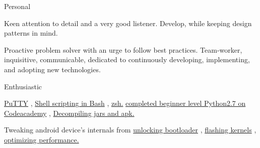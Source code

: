 \begin{skillsentries}
    
    \skillsentry
    {Personal} %
    {
      \begin{skillsitems} %
        \item {Keen attention to detail and a very good listener. Develop, while keeping design patterns in mind.}
        \item {Proactive problem solver with an urge to follow best practices. Team-worker, inquisitive, communicable, 
        dedicated to continuously developing, implementing, and adopting new technologies.}
      \end{skillsitems}
      }
      
      \skillsentry
      {Enthusiastic} %
      {
        \begin{skillsitems} %
          \item {{\href{https://www.putty.org}{PuTTY}}
          , 
          {\href{https://en.wikibooks.org/wiki/Bash_Shell_Scripting}{Shell scripting in Bash}}
          ,  
          {\href{http://zsh.sourceforge.net}{zsh.}} 
          {\href{https://www.codecademy.com/learn}{completed beginner level Python2.7 on Codeacademy}}
          , 
          {\href{https://www.xda-developers.com/decompile-and-modify-apks-on-the-go-with-apktool-for-android/}{Decompiling jars and apk.}}}
          \item {Tweaking android device's internals from 
          {\href{https://forum.xda-developers.com/wiki/Bootloader}{unlocking bootloader}}
          , 
          {\href{https://forum.xda-developers.com/google-nexus-5/development\#kernels}{flashing kernels}}
          , 
          {\href{https://forum.xda-developers.com/google-nexus-5/general/android-toolkit-t2690032}{optimizing performance.}}}
        \end{skillsitems}
      }
\end{skillsentries}
